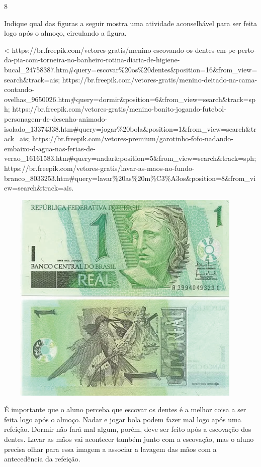 {{{{{\num{8}

Indique qual das figuras a seguir mostra uma atividade aconselhável para
ser feita logo após o almoço, circulando a figura.

\textless{}
https://br.freepik.com/vetores-gratis/menino-escovando-os-dentes-em-pe-perto-da-pia-com-torneira-no-banheiro-rotina-diaria-de-higiene-bucal\_24758387.htm\#query=escovar\%20os\%20dentes\&position=16\&from\_view=search\&track=ais;
https://br.freepik.com/vetores-gratis/menino-deitado-na-cama-contando-ovelhas\_9650026.htm\#query=dormir\&position=6\&from\_view=search\&track=sph;
https://br.freepik.com/vetores-gratis/menino-bonito-jogando-futebol-personagem-de-desenho-animado-isolado\_13374338.htm\#query=jogar\%20bola\&position=1\&from\_view=search\&track=ais;
https://br.freepik.com/vetores-premium/garotinho-fofo-nadando-embaixo-d-agua-nas-ferias-de-verao\_16161583.htm\#query=nadar\&position=5\&from\_view=search\&track=sph;
https://br.freepik.com/vetores-gratis/lavar-as-maos-no-fundo-branco\_8033253.htm\#query=lavar\%20as\%20m\%C3\%A3os\&position=8\&from\_view=search\&track=ais.

\includegraphics[width=5.00000in,height=4.05208in]{media/image64.png}

É importante que o aluno perceba que escovar os dentes é a
melhor coisa a ser feita logo após o almoço. Nadar e jogar bola podem
fazer mal logo após uma refeição. Dormir não fará mal algum, porém, deve
ser feito após a escovação dos dentes. Lavar as mãos vai acontecer
também junto com a escovação, mas o aluno precisa olhar para essa imagem
a associar a lavagem das mãos com a antecedência da refeição. 

}}}}}
